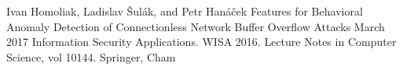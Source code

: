 \begin{cventries}
  \cventry
    {Ivan Homoliak, Ladislav Šulák, and Petr Hanáček}
    {Features for Behavioral Anomaly Detection of Connectionless Network Buffer Overflow Attacks}
    {}
    {March 2017}
    {Information Security Applications. WISA 2016. Lecture Notes in Computer Science, vol 10144. Springer, Cham}

\end{cventries}
